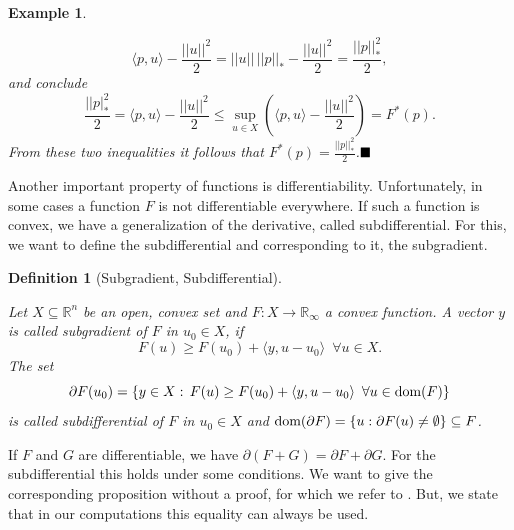 \documentclass{scrreprt}
\newcommand{\qed}{$\hfill\blacksquare$}
\newtheorem{definition}[theorem]{Definition}
\newtheorem{example}[theorem]{Example}
\begin{document}
\begin{example}
\begin{enumerate}
                    $$
                        \langle p, u \rangle - \frac{||u||^{2}}{2} = ||u||\,||p||_{\ast} - \frac{||u||^{2}}{2} = \frac{||p||^{2}_{\ast}}{2},
                    $$
                and conclude
                    $$
                        \frac{||p|_{\ast}^{2}}{2} = \langle p, u \rangle - \frac{||u||^{2}}{2} \le \sup\limits_{u \in X} \left( \langle p, u \rangle - \frac{||u||^{2}}{2} \right) = F^{\ast}(p).
                    $$
                From these two inequalities it follows that $F^{\ast}(p) = \frac{||p||_{\ast}^{2}}{2}$.\qed
            \end{enumerate}
        \end{example}

        Another important property of functions is differentiability. Unfortunately, in some cases a function $F$ is not differentiable everywhere. If such a function is convex, we have a generalization of the derivative, called subdifferential. For this, we want to define the subdifferential and corresponding to it, the subgradient.

        \begin{definition}[Subgradient, Subdifferential] %
        \label{def:subgradient_subdifferential}

            Let $X \subseteq \mathbb{R}^{n}$ be an open, convex set and $F: X \longrightarrow \mathbb{R}_{\infty}$ a convex function. A vector $y$ is called subgradient of $F$ in $u_{0} \in X$, if
                \begin{equation}
                    F(u) \ge F(u_{0}) + \langle y, u - u_{0} \rangle \,\,\, \forall u \in X.
                \label{eq:subgradient}
                \end{equation}
            The set
                $$
                    \partial F(u_{0}) = \{ y \in X: \, F(u) \ge F(u_{0}) + \langle y, u - u_{0} \rangle \,\,\, \forall u \in \textnormal{dom}(F) \}
                $$
            is called subdifferential of $F$ in $u_{0} \in X$ and $\textnormal{dom}(\partial F) = \{ u: \partial F(u) \ne \emptyset \} \subseteq F$.

        \end{definition}

        If $F$ and $G$ are differentiable, we have $\partial(F + G) = \partial F + \partial G$. For the subdifferential this holds under some conditions. We want to give the corresponding proposition without a proof, for which we refer to \cite{Rockafellar}. But, we state that in our computations this equality can always be used.
\end{document}

